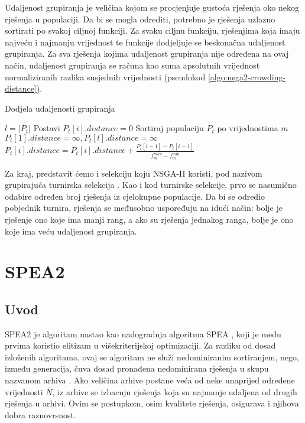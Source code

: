 \documentclass[times, utf8, zavrsni, numeric]{fer}
\begin{document}
Udaljenost grupiranja je veličina kojom se procjenjuje gustoća rješenja oko nekog rješenja u populaciji. Da bi se mogla odrediti, potrebno je rješenja uzlazno sortirati po svakoj ciljnoj funkciji. Za svaku ciljnu funkciju, rješenjima koja imaju najveću i najmanju vrijednost te funkcije dodjeljuje se beskonačna udaljenost grupiranja. Za sva rješenja kojima udaljenost grupiranja nije određena na ovaj način, udaljenost grupiranja se računa kao suma apsolutnih vrijednost normaliziranih razlika susjednih vrijednosti (pseudokod \ref{algo:nsga2-crowding-distance}).\\

\begin{algorithm}
\caption{Dodjela udaljenosti grupiranja}
\label{algo:nsga2-crowding-distance}
\begin{algorithmic}
\STATE $l=\vert P_t\vert$
\STATE Postavi $P_t[i].distance = 0$
\ENDFOR
{}
\STATE Sortiraj populaciju $P_t$ po vrijednostima $m$
\STATE $P_t[1].distance = \infty, P_t[l].distance = \infty$
\STATE $P_t[i].distance = P_t[i].distance + \frac{P_t[i + 1] - P_t[i - 1]}{f_m^{max} - f_m^{\min}}$
\ENDFOR
\ENDFOR 
\end{algorithmic}
\end{algorithm}

Za kraj, predstavit ćemo i selekciju koju NSGA-II koristi, pod nazivom grupirajuća turnirska selekcija . Kao i kod turnirske selekcije, prvo se nasumično odabire određen broj rješenja iz cjelokupne populacije. Da bi se odredio pobjednik turnira, rješenja se međusobno uspoređuju na idući način: bolje je rješenje ono koje ima manji rang, a ako su rješenja jednakog ranga, bolje je ono koje ima veću udaljenost grupiranja. 
\FloatBarrier
\section{SPEA2}
\subsection{Uvod}
SPEA2 \citep{spea2} je algoritam nastao kao nadogradnja algoritma SPEA \citep{spea}, koji je među prvima koristio elitizam u višekriterijskoj optimizaciji. Za razliku od dosad izloženih algoritama, ovaj se algoritam ne služi nedominiranim sortiranjem, nego, između generacija, čuva dosad pronađena nedominirana rješenja u skupu nazvanom arhiva . Ako veličina arhive postane veća od neke unaprijed određene vrijednosti $\overline{N}$, iz arhive se izbacuju rješenja koja su najmanje udaljena od drugih rješenja u arhivi. Ovim se postupkom, osim kvalitete rješenja, osigurava i njihova dobra raznovrsnost.
\end{document}
